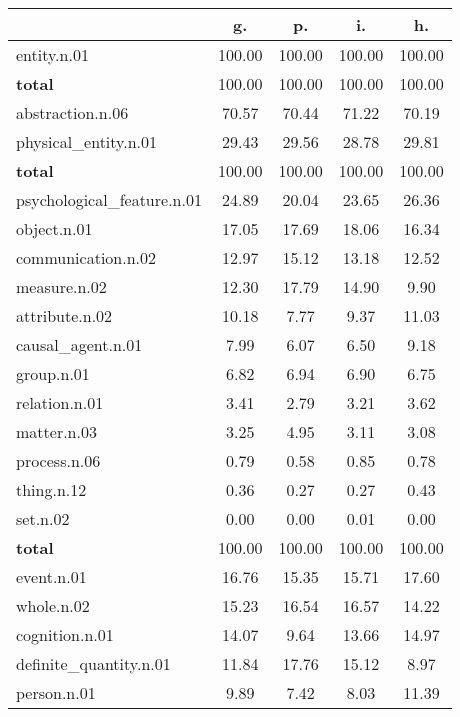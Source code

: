 \begin{table}[h!]
\begin{center}
\begin{tabular}{| l || c | c | c | c |}\hline
 & {\bf g.} & {\bf p.} & {\bf i.} & {\bf h.} \\\hline\hline
entity.n.01 & 100.00  & 100.00  & 100.00  & 100.00 \\\hline\hline
{{\bf total}} & 100.00  & 100.00  & 100.00  & 100.00 \\\hline\hline\hline
abstraction.n.06 & 70.57  & 70.44  & 71.22  & 70.19 \\\hline
physical\_entity.n.01 & 29.43  & 29.56  & 28.78  & 29.81 \\\hline\hline
{{\bf total}} & 100.00  & 100.00  & 100.00  & 100.00 \\\hline\hline\hline
psychological\_feature.n.01 & 24.89  & 20.04  & 23.65  & 26.36 \\\hline
object.n.01 & 17.05  & 17.69  & 18.06  & 16.34 \\\hline
communication.n.02 & 12.97  & 15.12  & 13.18  & 12.52 \\\hline
measure.n.02 & 12.30  & 17.79  & 14.90  & 9.90 \\\hline
attribute.n.02 & 10.18  & 7.77  & 9.37  & 11.03 \\\hline
causal\_agent.n.01 & 7.99  & 6.07  & 6.50  & 9.18 \\\hline
group.n.01 & 6.82  & 6.94  & 6.90  & 6.75 \\\hline
relation.n.01 & 3.41  & 2.79  & 3.21  & 3.62 \\\hline
matter.n.03 & 3.25  & 4.95  & 3.11  & 3.08 \\\hline
process.n.06 & 0.79  & 0.58  & 0.85  & 0.78 \\\hline
thing.n.12 & 0.36  & 0.27  & 0.27  & 0.43 \\\hline
set.n.02 & 0.00  & 0.00  & 0.01  & 0.00 \\\hline\hline
{{\bf total}} & 100.00  & 100.00  & 100.00  & 100.00 \\\hline\hline\hline
event.n.01 & 16.76  & 15.35  & 15.71  & 17.60 \\\hline
whole.n.02 & 15.23  & 16.54  & 16.57  & 14.22 \\\hline
cognition.n.01 & 14.07  & 9.64  & 13.66  & 14.97 \\\hline
definite\_quantity.n.01 & 11.84  & 17.76  & 15.12  & 8.97 \\\hline
person.n.01 & 9.89  & 7.42  & 8.03  & 11.39 \\\hline

\end{tabular}
\end{center}
\end{table}
